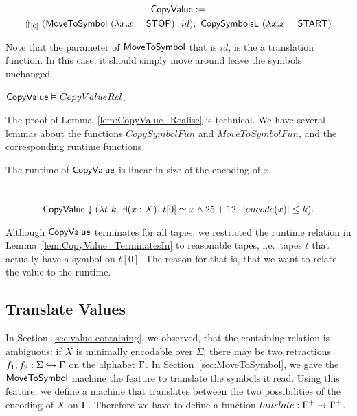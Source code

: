 \begin{definition}[$\MS{CopyValue}$]
  \label{def:CopyValue}
  ~
  \begin{multline*}
    \MS{CopyValue} := \\
    \LiftTapes{(\MS{MoveToSymbol}~(\lambda x. x=\MS{STOP})~~id)}{\Vector{0}}
    \Seq
    \MS{CopySymbolsL}~(\lambda x. x=\MS{START})
  \end{multline*}
\end{definition}

Note that the parameter of $\MS{MoveToSymbol}$ that is $id$, is the a translation function.  In this case, it should simply move around leave the
symbols unchanged.

\begin{lemma}
  \label{lem:CopyValue_Realise}
  $\MS{CopyValue} \vDash CopyValueRel$.
\end{lemma}

The proof of Lemma~\ref{lem:CopyValue_Realise} is technical.  We have several lemmas about the functions $CopySymbolFun$ and $MoveToSymbolFun$, and
the corresponding runtime functions.

The runtime of $\MS{CopyValue}$ is linear in size of the encoding of $x$.
\begin{lemma}
  \label{lem:CopyValue_TerminatesIn}
  ~
  \[
    \MS{CopyValue} \downarrow (\lambda t~k.~\exists(x:X).~t[0] \simeq x \land 25 + 12 \cdot \size{x} \leq k).
  \]
\end{lemma}

Although $\MS{CopyValue}$ terminates for all tapes, we restricted the runtime relation in Lemma~\ref{lem:CopyValue_TerminatesIn} to reasonable tapes,
i.e.\ tapes $t$ that actually have a symbol on $t[0]$.  The reason for that is, that we want to relate the value to the runtime.

\subsection{Translate Values}
\label{sec:translate-value}

In Section~\ref{sec:value-containing}, we observed, that the containing relation is ambiguous: if $X$ is minimally encodable over $\Sigma$, there may
be two retractions $f_1, f_2 : \Sigma \hookrightarrow \Tau$ on the alphabet $\Tau$.  In Section~\ref{sec:MoveToSymbol}, we {\color{red}gave} the
$\MS{MoveToSymbol}$ machine the feature to translate the symbols it read.  Using this feature, we define a machine that translates between the two
possibilities of the encoding of $X$ on $\Tau$.  Therefore we have to define a function $tanslate : \Tau^+ \to \Tau^+$.

